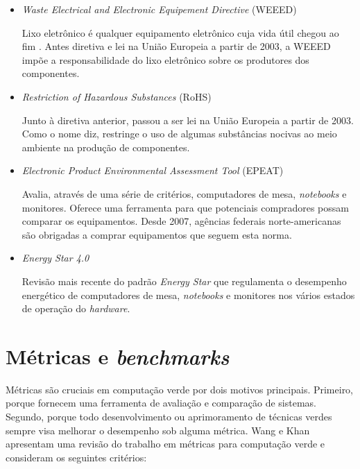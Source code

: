 \begin{itemize}
    \item \emph{Waste Electrical and Electronic Equipement Directive} (WEEED)

    Lixo eletrônico é qualquer equipamento eletrônico cuja vida útil chegou ao fim \cite{puckett2002exporting}. Antes diretiva e lei na União Europeia a partir de 2003, a WEEED impõe a responsabilidade do lixo eletrônico sobre os produtores dos componentes.

    \item \emph{Restriction of Hazardous Substances} (RoHS)

    Junto à diretiva anterior, passou a ser lei na União Europeia a partir de 2003. Como o nome diz, restringe o uso de algumas substâncias nocivas ao meio ambiente na produção de componentes.

    \item \emph{Electronic Product Environmental Assessment Tool} (EPEAT)

    Avalia, através de uma série de critérios, computadores de mesa, \emph{notebooks} e monitores. Oferece uma ferramenta para que potenciais compradores possam comparar os equipamentos. Desde 2007, agências federais norte-americanas são obrigadas a comprar equipamentos que seguem esta norma.

    \item \emph{Energy Star 4.0}

    Revisão mais recente do padrão \emph{Energy Star} que regulamenta o desempenho energético de computadores de mesa, \emph{notebooks} e monitores nos vários estados de operação do \emph{hardware}.

\end{itemize}

\section{Métricas e \emph{benchmarks}}

Métricas são cruciais em computação verde por dois motivos principais. Primeiro, porque fornecem uma ferramenta de avaliação e comparação de sistemas. Segundo, porque todo desenvolvimento ou aprimoramento de técnicas verdes sempre visa melhorar o desempenho sob alguma métrica. Wang e Khan \cite{wang2013review} apresentam uma revisão do trabalho em métricas para computação verde e consideram os seguintes critérios:

